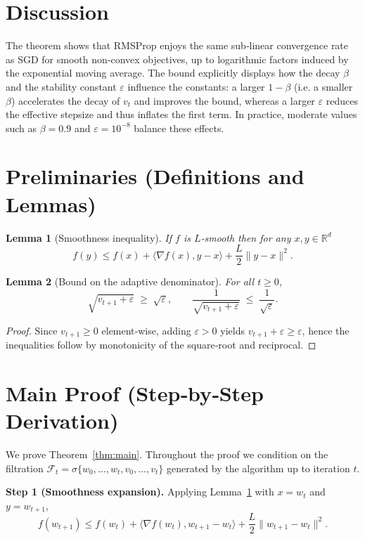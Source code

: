 \documentclass{article}
\newtheorem{lemma}{Lemma}
\newcommand{\RR}{\mathbb{R}}
\begin{document}
\section*{Discussion}
The theorem shows that RMSProp enjoys the same sub‑linear convergence rate as SGD for smooth
non‑convex objectives, up to logarithmic factors induced by the exponential moving average.
The bound explicitly displays how the decay $\beta$ and the stability constant $\varepsilon$
influence the constants: a larger $1-\beta$ (i.e. a smaller $\beta$) accelerates the decay of $v_{t}$
and improves the bound, whereas a larger $\varepsilon$ reduces the effective stepsize and thus
inflates the first term. In practice, moderate values such as $\beta=0.9$ and $\varepsilon=10^{-8}$
balance these effects.

\newpage
\section*{Preliminaries (Definitions and Lemmas)}
\begin{lemma}[Smoothness inequality]\label{lem:smooth}
If $f$ is $L$‑smooth then for any $x,y\in\RR^{d}$
\[
f(y)\le f(x)+\langle\nabla f(x),y-x\rangle+\frac{L}{2}\|y-x\|^{2}.
\]
\end{lemma}
\begin{lemma}[Bound on the adaptive denominator]\label{lem:denom}
For all $t\ge0$,
\[
\sqrt{v_{t+1}+\varepsilon}\;\ge\;\sqrt{\varepsilon},\qquad
\frac{1}{\sqrt{v_{t+1}+\varepsilon}}\;\le\;\frac{1}{\sqrt{\varepsilon}}.
\]
\end{lemma}
\begin{proof}
Since $v_{t+1}\ge0$ element‑wise, adding $\varepsilon>0$ yields $v_{t+1}+\varepsilon\ge\varepsilon$,
hence the inequalities follow by monotonicity of the square‑root and reciprocal.
\end{proof}

\section*{Main Proof (Step‑by‑Step Derivation)}
We prove Theorem~\ref{thm:main}.  Throughout the proof we condition on the filtration
$\mathcal{F}_{t}= \sigma\{w_{0},\dots,w_{t},v_{0},\dots,v_{t}\}$ generated by the algorithm up to iteration $t$.

\bigskip
\noindent\textbf{Step 1 (Smoothness expansion).}  
Applying Lemma~\ref{lem:smooth} with $x=w_{t}$ and $y=w_{t+1}$,
\[
f(w_{t+1})\le f(w_{t})
+ \big\langle\nabla f(w_{t}), w_{t+1}-w_{t}\big\rangle
+ \frac{L}{2}\|w_{t+1}-w_{t}\|^{2}.
\tag{1}
\]
\end{document}
